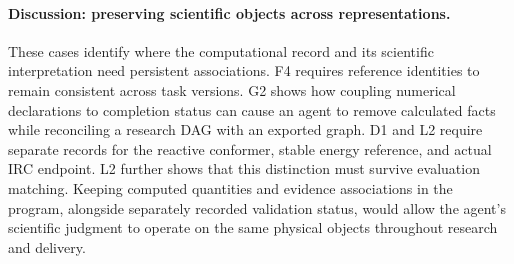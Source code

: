 \paragraph{Discussion: preserving scientific objects across representations.}
These cases identify where the computational record and its scientific interpretation need persistent associations. F4 requires reference identities to remain consistent across task versions. G2 shows how coupling numerical declarations to completion status can cause an agent to remove calculated facts while reconciling a research DAG with an exported graph. D1 and L2 require separate records for the reactive conformer, stable energy reference, and actual IRC endpoint. L2 further shows that this distinction must survive evaluation matching. Keeping computed quantities and evidence associations in the program, alongside separately recorded validation status, would allow the agent's scientific judgment to operate on the same physical objects throughout research and delivery.
